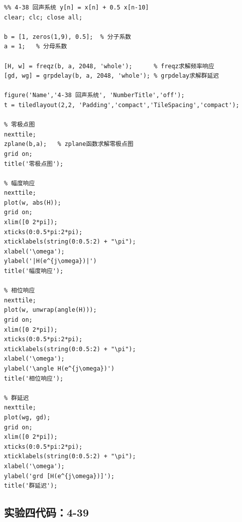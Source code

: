 \documentclass[UTF8,12pt,a4paper]{ctexart}
\begin{document}
\begin{lstlisting}
%% 4-38 回声系统 y[n] = x[n] + 0.5 x[n-10]
clear; clc; close all;

b = [1, zeros(1,9), 0.5];  % 分子系数
a = 1;   % 分母系数

[H, w] = freqz(b, a, 2048, 'whole');      % freqz求解频率响应
[gd, wg] = grpdelay(b, a, 2048, 'whole'); % grpdelay求解群延迟

figure('Name','4-38 回声系统', 'NumberTitle','off');
t = tiledlayout(2,2, 'Padding','compact','TileSpacing','compact');

% 零极点图
nexttile; 
zplane(b,a);   % zplane函数求解零极点图
grid on; 
title('零极点图');

% 幅度响应
nexttile; 
plot(w, abs(H)); 
grid on; 
xlim([0 2*pi]);
xticks(0:0.5*pi:2*pi);
xticklabels(string(0:0.5:2) + "\pi");
xlabel('\omega'); 
ylabel('|H(e^{j\omega})|')
title('幅度响应');

% 相位响应
nexttile; 
plot(w, unwrap(angle(H))); 
grid on; 
xlim([0 2*pi]);
xticks(0:0.5*pi:2*pi);
xticklabels(string(0:0.5:2) + "\pi");
xlabel('\omega'); 
ylabel('\angle H(e^{j\omega})')
title('相位响应');

% 群延迟
nexttile; 
plot(wg, gd); 
grid on; 
xlim([0 2*pi]);
xticks(0:0.5*pi:2*pi);
xticklabels(string(0:0.5:2) + "\pi");
xlabel('\omega'); 
ylabel('grd [H(e^{j\omega})]'); 
title('群延迟');
\end{lstlisting}

\subsection{实验四代码：4-39}
\end{document}
